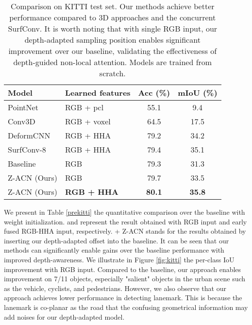 \documentclass[lettersize,journal]{IEEEtran}
\begin{document}
\begin{table}[t]
\centering
\caption{Comparison on KITTI test set. Our methods achieve better performance compared to 3D approaches and the concurrent SurfConv. It is worth noting that with single RGB input, our depth-adapted sampling position enables significant improvement over our baseline, validating the effectiveness of depth-guided non-local attention. Models are trained from scratch.}
\begin{tabular}[ht]{p{2cm}| p{2.2cm} c c  }
\hline

\hline
Model & Learned features & Acc (\%)  & mIoU (\%) \\
\hline
PointNet \cite{Qi2017pointnet} &  RGB + pcl &55.1 & 9.4\\
Conv3D \cite{tchapmi2017segcloud,song2017semantic} & RGB + voxel &  64.5 & 17.5\\ 
DeformCNN \cite{dai2017deformable} &  RGB + HHA & 79.2& 34.2 \\
SurfConv-8 \cite{chu2018surfconv} & RGB + HHA & 79.4& 35.1 \\
\hline
\hline
Baseline & RGB &  79.3   & 31.3  \\
Z-ACN (Ours)  & RGB&  79.7   & 33.5  \\
Z-ACN (Ours)& \textbf{RGB + HHA} &  \textbf{80.1}  & \textbf{35.8} \\
\hline

\hline
\end{tabular}

\label{scratchkitti}
\end{table}

We present in Table \ref{prekitti} the quantitative comparison over the baseline with weight initialization.  and  represent the result obtained with RGB input and early fused RGB-HHA input, respectively. + Z-ACN stands for the results obtained by inserting our depth-adapted offset into the baseline. It can be seen that our methods can significantly enable gains over the baseline performance with improved depth-awareness. We illustrate in Figure \ref{fig:kitti} the per-class IoU improvement with RGB input. Compared to the baseline, our approach enables improvement on 7/11 objects, especially "salient" objects in the urban scene such as the vehicle, cyclists, and pedestrians. However, we also observe that our approach achieves lower performance in detecting lanemark. This is because the lanemark is co-planar as the road that the confusing geometrical information may add noises for our depth-adapted model.
\end{document}
